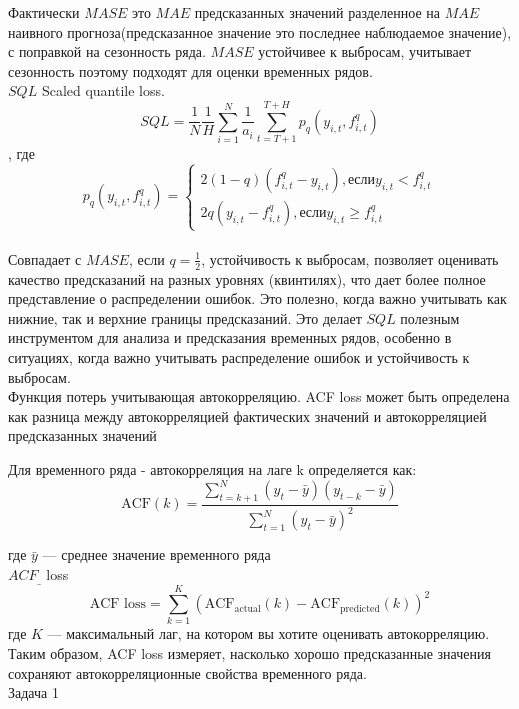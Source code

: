 Фактически $MASE$ это $MAE$ предсказанных значений разделенное на $MAE$ наивного прогноза(предсказанное значение это последнее наблюдаемое значение), с поправкой на сезонность ряда.
$MASE$ устойчивее к выбросам, учитывает сезонность поэтому подходят для оценки временных рядов.\\

$SQL$ Scaled quantile loss.
$$SQL = \frac{1}{N} \frac{1}{H} \sum_{i = 1}^{N} \frac{1}{a_{i}}\sum_{t = T + 1} ^ {T + H}p_{q}(y_{i,t}, f_{i,t}^{q})$$, где
$$p_{q}(y_{i,t}, f_{i,t}^{q}) = \begin{cases}
        2(1 - q)(f_{i,t}^q - y_{i,t}), если y_{i,t} < f_{i,t}^q \\
        2q(y_{i,t} - f_{i,t}^q ),если y_{i,t} \geq f_{i,t}^q
    \end{cases}$$
\\
Совпадает с $MASE$, если $q = \frac{1}{2}$, устойчивость к выбросам, позволяет оценивать качество предсказаний на разных уровнях (квинтилях), что дает более полное представление о распределении ошибок. Это полезно, когда важно учитывать как нижние, так и верхние границы предсказаний. Это делает $SQL$ полезным инструментом для анализа и предсказания временных рядов, особенно в ситуациях, когда важно учитывать распределение ошибок и устойчивость к выбросам.\\

Функция потерь учитывающая автокорреляцию. ACF loss может быть определена как разница между автокорреляцией фактических значений и автокорреляцией предсказанных значений

Для временного ряда - автокорреляция на лаге k определяется как:
\[
    \text{ACF}(k) = \frac{\sum_{t=k+1}^{N} (y_t - \bar{y})(y_{t-k} - \bar{y})}{\sum_{t=1}^{N} (y_t - \bar{y})^2}
\]

где \( \bar{y} \) — среднее значение временного ряда\\

$ACF_{\_}$ loss
\[
    \text{ACF loss} = \sum_{k=1}^{K} \left( \text{ACF}_{\text{actual}}(k) - \text{ACF}_{\text{predicted}}(k) \right)^2
\]
где \( K \) — максимальный лаг, на котором вы хотите оценивать автокорреляцию.
Таким образом, ACF loss измеряет, насколько хорошо предсказанные значения сохраняют автокорреляционные свойства временного ряда. \\

Задача 1\\

